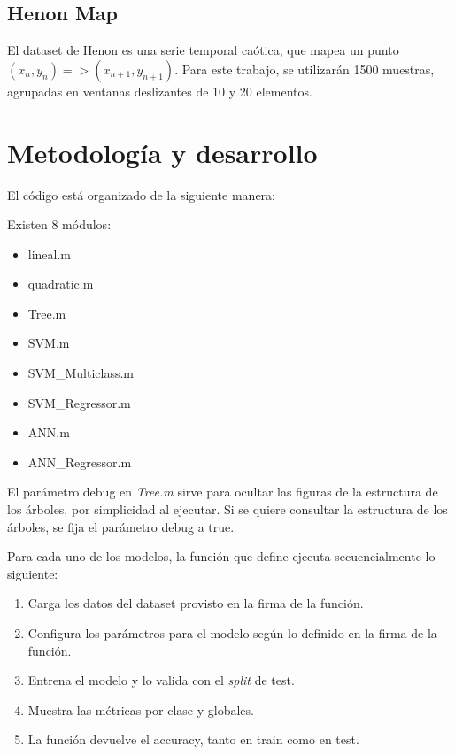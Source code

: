 \documentclass[a4paper,openwrite,12pt]{article}
\begin{document}
\subsection{Henon Map}
El dataset de Henon es una serie temporal caótica, que mapea un punto $(x_n,y_n) => (x_{n+1},y_{n+1})$.
Para este trabajo, se utilizarán 1500 muestras, agrupadas en ventanas deslizantes de 10 y 20 elementos.

\section{Metodología y desarrollo}

El código está organizado de la siguiente manera:

Existen 8 módulos:

\begin{itemize}
    \item lineal.m
    \item quadratic.m
    \item Tree.m
    \item SVM.m
    \item SVM\_Multiclass.m
    \item SVM\_Regressor.m
    \item ANN.m
    \item ANN\_Regressor.m
\end{itemize}



El parámetro debug en \textit{Tree.m} sirve para ocultar las figuras de la estructura de los árboles, por simplicidad al ejecutar. Si se quiere consultar la estructura de los árboles, se fija el parámetro debug a true.

Para cada uno de los modelos, la función que define ejecuta secuencialmente lo siguiente:

\begin{enumerate}
    \item Carga los datos del dataset provisto en la firma de la función.
    \item Configura los parámetros para el modelo según lo definido en la firma de la función.
    \item Entrena el modelo y lo valida con el \textit{split} de test.
    \item Muestra las métricas por clase y globales.
    \item La función devuelve el accuracy, tanto en train como en test.
\end{enumerate}
\end{document}
